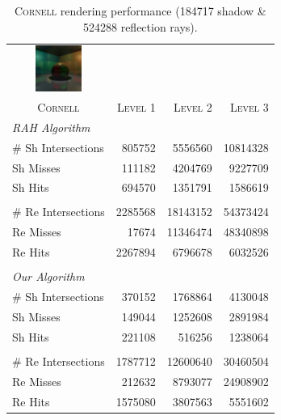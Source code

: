 \begin{table}[!htb]
\begin{center}
\fontsize{7}{9}
\selectfont
\begin{tabular}{l|rrr}
    \multicolumn{1}{c}{\includegraphics[width=1.5cm]{Images/Cornell_Preview}} & & \\
    \multicolumn{1}{c|}{\textsc{Cornell}} & \textsc{Level 1} & \textsc{Level 2} & \textsc{Level 3}\\
    \hline
    \emph{RAH Algorithm} & & \\
    \hline
    \quad \# Sh Intersections   & 805752	 & 5556560		& 10814328	 \\
    \quad Sh Misses             & 111182	 & 4204769	    & 9227709	 \\
    \quad Sh Hits               & 694570	 & 1351791		& 1586619	 \\
    & & \\
    \quad \# Re Intersections   & 2285568	 & 18143152	    & 54373424	 \\
    \quad Re Misses             & 17674		 & 11346474	    & 48340898	 \\
    \quad Re Hits               & 2267894	 & 6796678	    & 6032526    \\

    & & \\

    \hline
    \emph{Our Algorithm} & & \\
    \hline
    \quad \# Sh Intersections   & 370152		 & 1768864	    & 4130048	 \\
    \quad Sh Misses             & 149044		 & 1252608		& 2891984	 \\
    \quad Sh Hits               & 221108		 & 516256	    & 1238064	 \\
    & & \\
    \quad \# Re Intersections   & 1787712	     & 12600640	    & 30460504	 \\
    \quad Re Misses             & 212632		 & 8793077	    & 24908902   \\
    \quad Re Hits               & 1575080		 & 3807563	    & 5551602	 \\
\end{tabular}
\end{center}
\caption{\label{table:cornell-results}
\textsc{Cornell} rendering performance (184717 shadow \& 524288 reflection rays).}
\end{table}

